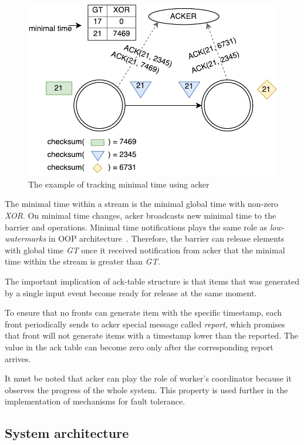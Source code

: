\begin{figure}[htbp]
  \centering
  \includegraphics[scale=0.58]{pics/acker}
  \caption{The example of tracking minimal time using acker}
  \label {acker}
\end{figure}

The minimal time within a stream is the minimal global time with non-zero {\it XOR}. On minimal time changes, acker broadcasts new minimal time to the barrier and operations. Minimal time notifications plays the same role as {\em low-watermarks} in OOP architecture~\cite{Li:2008:OPN:1453856.1453890}. Therefore, the barrier can release elements with global time {\it GT} once it received notification from acker that the minimal time within the stream is greater than {\it GT}.

The important implication of ack-table structure is that items that was generated by a single input event become ready for release at the same moment.

To ensure that no fronts can generate item with the specific timestamp, each front periodically sends to acker special message called {\it report}, which promises that front will not generate items with a timestamp lower than the reported. The value in the ack table can become zero only after the corresponding report arrives.

It must be noted that acker can play the role of worker's coordinator because it observes the progress of the whole system. This property is used further in the implementation of mechanisms for fault tolerance. 

\subsection{System architecture}

